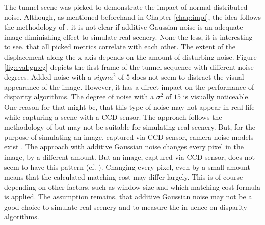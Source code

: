 \noindent The tunnel scene was picked to demonstrate the impact of normal distributed noise.
Although, as mentioned beforehand in Chapter \ref{chap:impl}, the idea follows the methodology of \citeauthor{richardt2010real} \citep{richardt2010real}, it is not clear if additive Gaussian noise is an adequate image diminishing effect to simulate real scenery.
None the less, it is interesting to see, that all picked metrics correlate with each other.
The extent of the displacement along the x-axis depends on the amount of disturbing noise.
Figure \ref{fig:eval:gn:eg} depicts the first frame of the tunnel sequence with different noise degrees.
Added noise with a $sigma^2$ of $5$ does not seem to distract the visual appearance of the image.
However, it has a direct impact on the performance of disparity algorithms.
The degree of noise with a $\sigma^2$ of $15$ is visually noticeable.
One reason for that might be, that this type of noise may not appear in real-life while capturing a scene with a CCD sensor.
The approach follows the methodology of \citeauthor{richardt2010real} \citep{richardt2010real} but may not be suitable for simulating real scenery.
But, for the purpose of simulating an image, captured via CCD sensor, camera noise models exist \citep{liu2006noise}.
The approach with additive Gaussian noise changes every pixel in the image, by a different amount.
But an image, captured via CCD sensor, does not seem to have this pattern (cf. \citep{liu2006noise}).
Changing every pixel, even by a small amount means that the calculated matching cost may differ largely.
This is of course depending on other factors, such as window size and which matching cost formula is applied.
The assumption remains, that additive Gaussian noise may not be a good choice to simulate real scenery and to measure the in uence on disparity algorithms.

